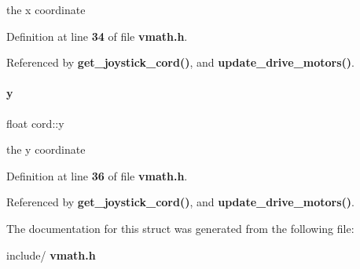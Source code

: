 the x coordinate 



Definition at line \textbf{ 34} of file \textbf{ vmath.\+h}.



Referenced by \textbf{ get\+\_\+joystick\+\_\+cord()}, and \textbf{ update\+\_\+drive\+\_\+motors()}.

\mbox{\label{a00199_a4e7d289c55cfe511532e53a81dc19215}} 
\paragraph{y}
{\footnotesize\ttfamily float cord\+::y}



the y coordinate 



Definition at line \textbf{ 36} of file \textbf{ vmath.\+h}.



Referenced by \textbf{ get\+\_\+joystick\+\_\+cord()}, and \textbf{ update\+\_\+drive\+\_\+motors()}.



The documentation for this struct was generated from the following file\+:\begin{DoxyCompactItemize}
\item 
include/\textbf{ vmath.\+h}\end{DoxyCompactItemize}
